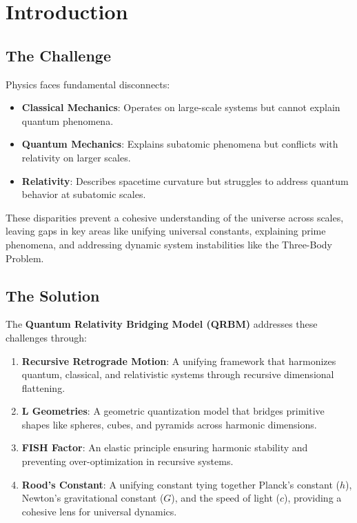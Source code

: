 \documentclass{article}
\begin{document}
\section*{Introduction}

\subsection*{The Challenge}
Physics faces fundamental disconnects:
\begin{itemize}
    \item \textbf{Classical Mechanics}: Operates on large-scale systems but cannot explain quantum phenomena.
    \item \textbf{Quantum Mechanics}: Explains subatomic phenomena but conflicts with relativity on larger scales.
    \item \textbf{Relativity}: Describes spacetime curvature but struggles to address quantum behavior at subatomic scales.
\end{itemize}

These disparities prevent a cohesive understanding of the universe across scales, leaving gaps in key areas like unifying universal constants, explaining prime phenomena, and addressing dynamic system instabilities like the Three-Body Problem.

\subsection*{The Solution}
The \textbf{Quantum Relativity Bridging Model (QRBM)} addresses these challenges through:
\begin{enumerate}
    \item \textbf{Recursive Retrograde Motion}: A unifying framework that harmonizes quantum, classical, and relativistic systems through recursive dimensional flattening.
    \item \textbf{L Geometries}: A geometric quantization model that bridges primitive shapes like spheres, cubes, and pyramids across harmonic dimensions.
    \item \textbf{FISH Factor}: An elastic principle ensuring harmonic stability and preventing over-optimization in recursive systems.
    \item \textbf{Rood’s Constant}: A unifying constant tying together Planck’s constant (\(h\)), Newton’s gravitational constant (\(G\)), and the speed of light (\(c\)), providing a cohesive lens for universal dynamics.
\end{enumerate}
\end{document}
